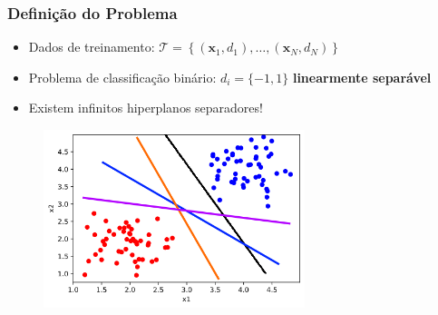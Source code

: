 \documentclass{beamer}
\begin{document}
\begin{frame}
	\frametitle{Definição do Problema}
	\begin{itemize}
		\item Dados de treinamento: $\mathcal{T} = \left\lbrace (\textbf{x}_1, d_1), \dots, (\textbf{x}_N, d_N)\right\rbrace $
		\item Problema de classificação binário: $d_i = \{ -1, 1 \} $ \textbf{linearmente separável}
		\item Existem infinitos hiperplanos separadores!
		
	\end{itemize}
	\begin{figure}[h!]
		\centering
		\includegraphics[width=3.0in]{fig01_01.png}
		\label{fig:plano-mse}
	\end{figure}

\end{frame}

\end{document}
